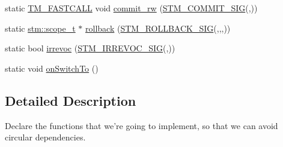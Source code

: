 \begin{DoxyCompactItemize}
\item 
static \hyperlink{platform_8hpp_a8b5d728e6eed8f368f9966f637d2f719}{T\-M\-\_\-\-F\-A\-S\-T\-C\-A\-L\-L} void \hyperlink{structanonymous__namespace_02profiletm_8cpp_03_1_1ProfileTM_a936d99cd04a66ac42675515d33127522}{commit\-\_\-rw} (\hyperlink{include_2stm_2macros_8hpp_a1b8304eb1082517c7dc31f3534b72343}{S\-T\-M\-\_\-\-C\-O\-M\-M\-I\-T\-\_\-\-S\-I\-G}(,))
\item 
static \hyperlink{namespacestm_a91badf88c88aacc831b01a315435a255}{stm\-::scope\-\_\-t} $\ast$ \hyperlink{structanonymous__namespace_02profiletm_8cpp_03_1_1ProfileTM_ad8e335237f23de1e18744d0d120fa7e1}{rollback} (\hyperlink{include_2stm_2macros_8hpp_a1c36a48149c84f90d5bca01019950ca9}{S\-T\-M\-\_\-\-R\-O\-L\-L\-B\-A\-C\-K\-\_\-\-S\-I\-G}(,,,))
\item 
static bool \hyperlink{structanonymous__namespace_02profiletm_8cpp_03_1_1ProfileTM_a8f337c40f17bf0f81c2006e8e17e355f}{irrevoc} (\hyperlink{include_2stm_2macros_8hpp_acf117c2df6442342f6603e1a12fa3b5c}{S\-T\-M\-\_\-\-I\-R\-R\-E\-V\-O\-C\-\_\-\-S\-I\-G}(,))
\item 
static void \hyperlink{structanonymous__namespace_02profiletm_8cpp_03_1_1ProfileTM_a0d29fb09c27ed8537253ee33ffb6744a}{on\-Switch\-To} ()
\end{DoxyCompactItemize}


\subsection{Detailed Description}
Declare the functions that we're going to implement, so that we can avoid circular dependencies. 


